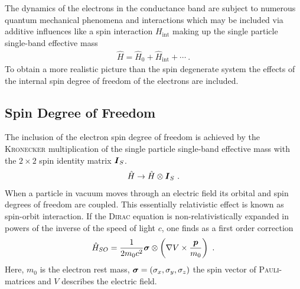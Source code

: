 The dynamics of the electrons in the conductance band are subject to numerous quantum mechanical phenomena and interactions which may be included via additive influences like a spin interaction \hamil{} $H_{\text{int}}$ making up the single particle single-band effective mass \hamil{}
\begin{align}
\hat{H} = \hat{H}_0 + \hat{H}_{\text{int}}+\dotsb \label{eqn:generalhamil}\ .
\end{align}
To obtain a more realistic picture than the spin degenerate system the effects of the internal spin degree of freedom of the electrons are included.
\subsection{Spin Degree of Freedom}
The inclusion of the electron spin degree of freedom is achieved by the \textsc{Kronecker} multiplication of the single particle single-band effective mass \hamil{}  with the $2 \times 2$ spin identity matrix $\boldsymbol{I}_S$. 
\begin{align}
\hat{H} \rightarrow \hat{H} \otimes \boldsymbol{I}_S\ .
\end{align}
When a particle in vacuum moves through an electric field its orbital and spin degrees of freedom are coupled. This essentially relativistic effect is known as spin-orbit interaction. If the \textsc{Dirac} equation is non-relativistically expanded in powers of the inverse of the speed of light $c$, one finds as a first order correction \cite{Nowack2009Thesis}
\begin{align}
\hat{H}_{SO} = \frac{1}{2m_0c^2} \boldsymbol{\sigma} \otimes \left( \nabla V \times \frac{\boldsymbol{p}}{m_0}\right)\ .
\label{eqn:spinorbithamil}
\end{align}
Here, $m_0$ is the electron rest mass, $\boldsymbol{\sigma} = (\sigma_x, \sigma_y,\sigma_z)$ the spin vector of \textsc{Pauli}-matrices and $V$ describes the electric field. 
